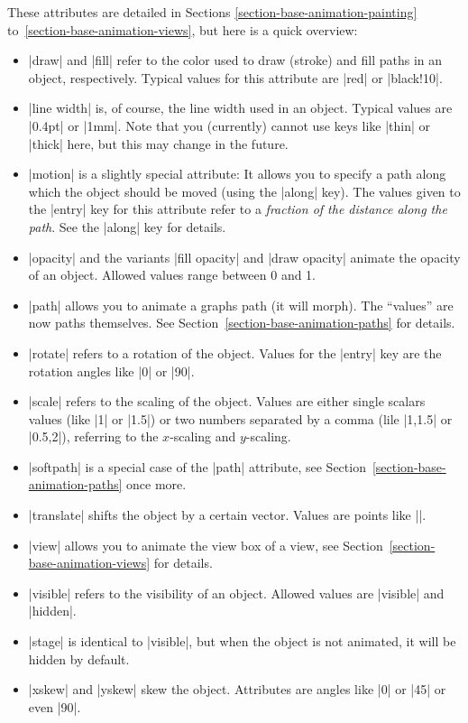 \begin{command}{\pgfanimateattribute{}}
  These attributes are detailed in
  Sections \ref{section-base-animation-painting}
  to~\ref{section-base-animation-views}, but here is a quick overview:
  \begin{itemize}
  \item |draw| and |fill| refer to the color used to
    draw (stroke) and fill paths in an object, respectively. Typical
    values for this attribute are |red| or |black!10|.
  \item |line width| is, of course, the line width used in an
    object. Typical values are |0.4pt| or |1mm|. Note that you
    (currently) cannot use keys like |thin| or |thick| here, but this
    may change in the future.
  \item |motion| is a slightly special attribute: It allows you to
    specify a path along which the object should be moved (using the
    |along| key). The values given to the |entry| key for this
    attribute refer to a \emph{fraction of the distance along the
      path}. See the |along| key for details.
  \item |opacity| and the variants |fill opacity| and |draw opacity|
    animate the opacity of an object. Allowed values range between 0
    and 1.
  \item |path| allows you to animate a graphs path (it will
    morph). The ``values'' are now paths themselves. See
    Section~\ref{section-base-animation-paths} for details.
  \item |rotate| refers to a rotation of the object. Values for the
    |entry| key are the rotation angles like |0| or |90|.
  \item |scale| refers to the scaling of the object. Values are either
    single scalars values (like |1| or  |1.5|) or two numbers
    separated by a comma (lile |1,1.5| or |0.5,2|), referring to the
    $x$-scaling and $y$-scaling.
  \item |softpath| is a special case of the |path| attribute, see
    Section~\ref{section-base-animation-paths} once more.
  \item |translate| shifts the object by a certain vector. Values are
    points like |\pgfpoint{1cm}{2cm}|.
  \item |view| allows you to animate the view box of a view, see
    Section~\ref{section-base-animation-views} for details.
  \item |visible| refers to the visibility of an object. Allowed
    values are |visible| and |hidden|.
  \item |stage| is identical to |visible|, but when the object is not
    animated, it will be hidden by default.
  \item |xskew| and |yskew| skew the object. Attributes are angles
    like |0| or |45| or even |90|.
  \end{itemize}


\end{command}
